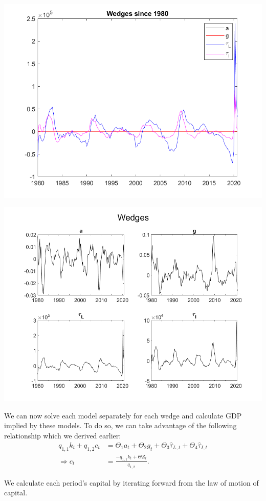 \documentclass[11pt]{article} %
\begin{document}
\includegraphics{wedges}

\includegraphics{wedges2}

We can now solve each model separately for each wedge and calculate GDP implied by these models. To do so, we can take advantage of the following relationship which we derived earlier:
\begin{align*}
q_{1,1}k_t + q_{1,2}c_t &= \Theta_1 a_t + \Theta_2 g_t + \Theta_3 \hat{\tau}_{L,t} + \Theta_4\hat{\tau}_{I,t}\\
\Rightarrow c_t &= \frac{-q_{1,1}k_t + \Theta Z_t }{q_{1,2}}.
\end{align*}

We calculate each period's capital by iterating forward from the law of motion of capital.
\end{document}
